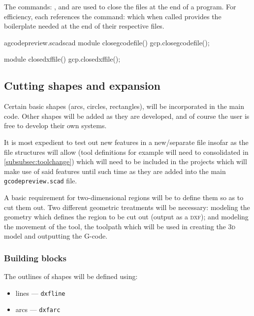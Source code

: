 \documentclass{ltxdoc}
\begin{document}
The commands: , and  are used to close the files at the end of a program. For efficiency, each references the command:  which when called provides the boilerplate needed at the end of their respective files.

\lstset{firstnumber=\thegcpscad}
\begin{writecode}{a}{gcodepreview.scad}{scad}
module closegcodefile(){
    gcp.closegcodefile();
}

module closedxffile(){
    gcp.closedxffile();
}

\end{writecode}
\addtocounter{gcpscad}{8}


\subsection{Cutting shapes and expansion}

Certain basic shapes (arcs, circles, rectangles), will be incorporated in the main code. Other shapes will be added as they are developed, and of course the user is free to develop their own systems.

 
It is most expedient to test out new features in a new/separate file insofar as the file structures will allow (tool definitions for example will need to consolidated in \ref{subsubsec:toolchange}) which will need to be included in the projects which will make use of said features until such time as they are added into the main \texttt{gcodepreview.scad} file.

A basic requirement for two-dimensional regions will be to define them so as to cut them out. Two different geometric treatments will be necessary: modeling the geometry which defines the region to be cut out (output as a \textsc{dxf}); and modeling the movement of the tool, the toolpath which will be used in creating the \textsc{3d} model and outputting the G-code.

\subsubsection{Building blocks}

The outlines of shapes will be defined using:

\begin{itemize}
\item lines --- \verb|dxfline|
\item arcs --- \verb|dxfarc|
\end{itemize}
\end{document}
